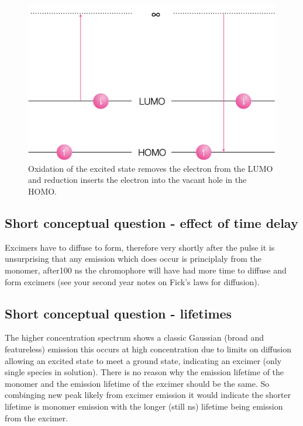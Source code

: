 \documentclass[
]{book}
\begin{document}
\begin{figure}

{\centering \includegraphics[width=0.7\linewidth]{images/excitedredox} 

}

\caption{Oxidation of the excited state removes the electron from the LUMO and reduction inserts the electron into the vacant hole in the HOMO.}\label{fig:excitedredox}
\end{figure}

\hypertarget{short-conceptual-question---effect-of-time-delay-1}{%
\subsection{Short conceptual question - effect of time delay}\label{short-conceptual-question---effect-of-time-delay-1}}

Excimers have to diffuse to form, therefore very shortly after the pulse it is unsurprising that any emission which does occur is principlaly from the monomer, after100 ns the chromophore will have had more time to diffuse and form excimers (see your second year notes on Fick's laws for diffusion).

\hypertarget{short-conceptual-question---lifetimes-1}{%
\subsection{Short conceptual question - lifetimes}\label{short-conceptual-question---lifetimes-1}}

The higher concentration spectrum shows a classic Gaussian (broad and featureless) emission this occurs at high concentration due to limits on diffusion allowing an excited state to meet a ground state, indicating an excimer (only single species in solution). There is no reason why the emission lifetime of the monomer and the emission lifetime of the excimer should be the same. So combinging new peak likely from excimer emission it would indicate the shorter lifetime is monomer emission with the longer (still ns) lifetime being emission from the excimer.
\end{document}
